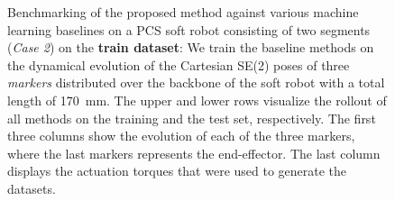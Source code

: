 \begin{figure}[ht]
    \caption{Benchmarking of the proposed method against various machine learning baselines on a PCS soft robot consisting of two segments (\emph{Case 2}) on the \textbf{train dataset}: We train the baseline methods on the dynamical evolution of the Cartesian SE(2) poses of three \emph{markers} distributed over the backbone of the soft robot with a total length of \SI{170}{mm}. The upper and lower rows visualize the rollout of all methods on the training and the test set, respectively. The first three columns show the evolution of each of the three markers, where the last markers represents the end-effector. The last column displays the actuation torques that were used to generate the datasets.}
    \label{fig:pcsregression:dynamics_pcs_ns-2_with_baselines:training}
\end{figure}
\begin{figure}[ht]
    \centering
    \\

\end{figure}
